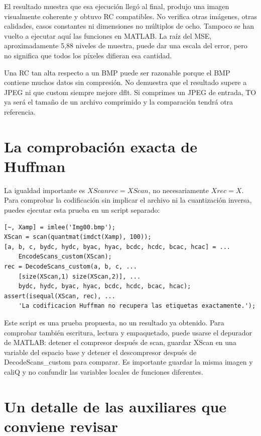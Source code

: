 \documentclass[11pt,a4paper,oneside]{report}
\begin{document}
El resultado muestra que esa ejecución llegó al final, produjo una imagen
visualmente coherente y obtuvo RC compatibles. No verifica otras imágenes,
otras calidades, casos constantes ni dimensiones no múltiplos de ocho.
Tampoco se han vuelto a ejecutar aquí las funciones en MATLAB. La raíz del
MSE, aproximadamente 5,88 niveles de muestra, puede dar una escala del error,
pero no significa que todos los píxeles difieran esa cantidad.

Una RC tan alta respecto a un BMP puede ser razonable porque el BMP contiene
muchos datos sin compresión. No demuestra que el resultado supere a JPEG ni
que custom siempre mejore dflt. Si comprimes un JPEG de entrada, TO ya será
el tamaño de un archivo comprimido y la comparación tendrá otra referencia.


\section{La comprobación exacta de Huffman}

La igualdad importante es $XScanrec=XScan$, no necesariamente $Xrec=X$.
Para comprobar la codificación sin implicar el archivo ni la cuantización inversa,
puedes ejecutar esta prueba en un script separado:


\begin{lstlisting}
[~, Xamp] = imlee('Img00.bmp');
XScan = scan(quantmat(imdct(Xamp), 100));
[a, b, c, bydc, hydc, byac, hyac, bcdc, hcdc, bcac, hcac] = ...
    EncodeScans_custom(XScan);
rec = DecodeScans_custom(a, b, c, ...
    [size(XScan,1) size(XScan,2)], ...
    bydc, hydc, byac, hyac, bcdc, hcdc, bcac, hcac);
assert(isequal(XScan, rec), ...
    'La codificacion Huffman no recupera las etiquetas exactamente.');
\end{lstlisting}


Este script es una prueba propuesta, no un resultado ya obtenido. Para comprobar
también escritura, lectura y empaquetado, puede usarse el depurador de MATLAB:
detener el compresor después de scan, guardar XScan en una variable del espacio
base y detener el descompresor después de DecodeScans\_custom para comparar.
Es importante guardar la misma imagen y caliQ y no confundir las variables
locales de funciones diferentes.

\section{Un detalle de las auxiliares que conviene revisar}
\end{document}
